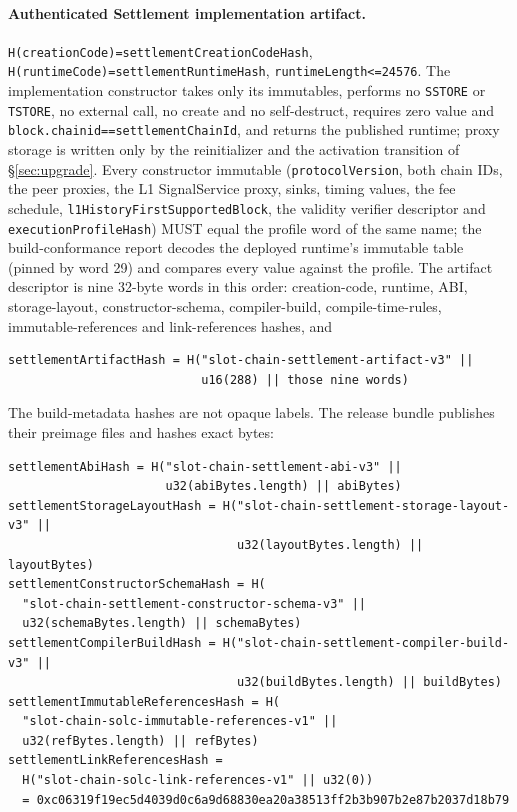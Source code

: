\documentclass[a4paper,11pt]{article}
\newcommand{\code}[1]{\nolinkurl{#1}}
\begin{document}
\paragraph{Authenticated Settlement implementation artifact.}
\code{H(creationCode)=settlementCreationCodeHash},
\code{H(runtimeCode)=settlementRuntimeHash}, \code{runtimeLength<=24576}.
The implementation constructor takes only its immutables, performs no
\code{SSTORE} or \code{TSTORE}, no external call, no create and no
self-destruct, requires zero value and \code{block.chainid==settlementChainId},
and returns the published runtime; proxy storage is written only by the
reinitializer and the activation transition of \S\ref{sec:upgrade}.  Every
constructor immutable (\code{protocolVersion}, both chain IDs, the peer
proxies, the L1 SignalService proxy, sinks, timing values, the fee schedule,
\code{l1HistoryFirstSupportedBlock}, the validity verifier descriptor and
\code{executionProfileHash}) MUST equal the profile word of the same name;
the build-conformance report decodes the deployed runtime's immutable table
(pinned by word 29) and compares every value against the profile.  The
artifact descriptor is nine 32-byte words in this order: creation-code,
runtime, ABI, storage-layout, constructor-schema, compiler-build,
compile-time-rules, immutable-references and link-references hashes, and
\begin{verbatim}
settlementArtifactHash = H("slot-chain-settlement-artifact-v3" ||
                           u16(288) || those nine words)
\end{verbatim}
The build-metadata hashes are not opaque labels.  The release bundle
publishes their preimage files and hashes exact bytes:
\begin{verbatim}
settlementAbiHash = H("slot-chain-settlement-abi-v3" ||
                      u32(abiBytes.length) || abiBytes)
settlementStorageLayoutHash = H("slot-chain-settlement-storage-layout-v3" ||
                                u32(layoutBytes.length) || layoutBytes)
settlementConstructorSchemaHash = H(
  "slot-chain-settlement-constructor-schema-v3" ||
  u32(schemaBytes.length) || schemaBytes)
settlementCompilerBuildHash = H("slot-chain-settlement-compiler-build-v3" ||
                                u32(buildBytes.length) || buildBytes)
settlementImmutableReferencesHash = H(
  "slot-chain-solc-immutable-references-v1" ||
  u32(refBytes.length) || refBytes)
settlementLinkReferencesHash =
  H("slot-chain-solc-link-references-v1" || u32(0))
  = 0xc06319f19ec5d4039d0c6a9d68830ea20a38513ff2b3b907b2e87b2037d18b79
\end{verbatim}
\end{document}
